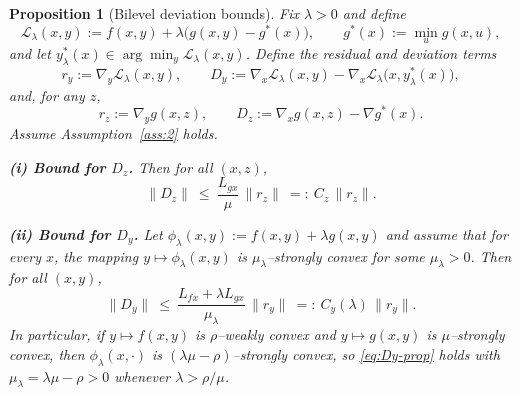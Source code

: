 \documentclass{article}
\newtheorem{proposition}[theorem]{Proposition}
\newcommand{\1}{\mathbf{1}}
\begin{document}
\begin{proposition}[Bilevel deviation bounds]\label{prop:bilevel-deviation}
Fix $\lambda>0$ and define
\[
\mathcal L_\lambda(x,y):=f(x,y)+\lambda\bigl(g(x,y)-g^*(x)\bigr),
\qquad
g^*(x):=\min_{u} g(x,u),
\]
and let $y_\lambda^*(x)\in\arg\min_y \mathcal L_\lambda(x,y)$.
Define the residual and deviation terms
\[
r_y:=\nabla_y \mathcal L_\lambda(x,y),
\qquad
D_y:=\nabla_x \mathcal L_\lambda(x,y)-\nabla_x \mathcal L_\lambda\bigl(x,y_\lambda^*(x)\bigr),
\]
and, for any $z$,
\[
r_z:=\nabla_y g(x,z),
\qquad
D_z:=\nabla_x g(x,z)-\nabla g^*(x).
\]
Assume Assumption~\ref{ass:2} holds. 

\smallskip
\noindent\textbf{(i) Bound for $D_z$.}
Then for all $(x,z)$,
\begin{equation}\label{eq:Dz-prop}
\|D_z\|
\ \le\
\frac{L_{gx}}{\mu}\,\|r_z\|
\ =:\ C_z\,\|r_z\|.
\end{equation}

\smallskip
\noindent\textbf{(ii) Bound for $D_y$.}
Let $\phi_\lambda(x,y):=f(x,y)+\lambda g(x,y)$ and assume that for every $x$,
the mapping $y\mapsto \phi_\lambda(x,y)$ is $\mu_\lambda$--strongly convex for some $\mu_\lambda>0$.
Then for all $(x,y)$,
\begin{equation}\label{eq:Dy-prop}
\|D_y\|
\ \le\
\frac{L_{fx}+\lambda L_{gx}}{\mu_\lambda}\,\|r_y\|
\ =:\ C_y(\lambda)\,\|r_y\|.
\end{equation}
In particular, if $y\mapsto f(x,y)$ is $\rho$--weakly convex and $y\mapsto g(x,y)$ is $\mu$--strongly convex,
then $\phi_\lambda(x,\cdot)$ is $(\lambda\mu-\rho)$--strongly convex, so \eqref{eq:Dy-prop} holds with
$\mu_\lambda=\lambda\mu-\rho>0$ whenever $\lambda>\rho/\mu$.
\end{proposition}
\end{document}
